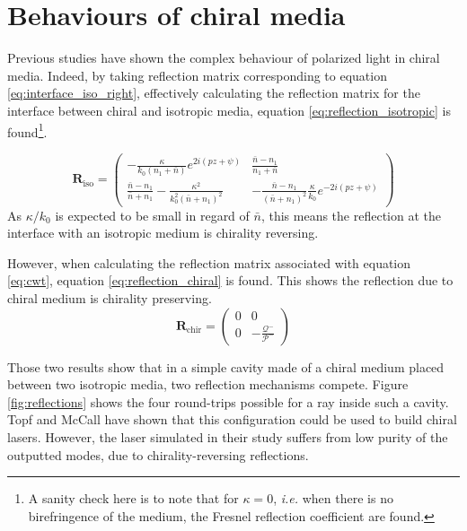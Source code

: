 \section{Behaviours of chiral media}

Previous studies\cite{mccall_simplified_2009} have shown the complex behaviour of polarized light in chiral media. Indeed, by taking reflection matrix corresponding to equation \ref{eq:interface_iso_right}, effectively calculating the reflection matrix for the interface between chiral and isotropic media, equation \ref{eq:reflection_isotropic} is found\footnote{A sanity check here is to note that for $\kappa=0$, \textit{i.e.} when there is no birefringence of the medium, the Fresnel reflection coefficient are found.}.

\begin{equation}
	\bm{R}_{\text{iso}} = \begin{pmatrix}
	-\frac{\kappa}{k_0(n_1+\bar{n})}e^{2i(pz+\psi)} & \frac{\bar{n}-n_1}{n_1+\bar{n}}\\
	\frac{\bar{n}-n_1}{\bar{n}+n_1}-\frac{\kappa^2}{k_0^2(\bar{n}+n_1)^2} & -\frac{\bar{n}-n_1}{(\bar{n}+n_1)^2}\frac{\kappa}{k_0}e^{-2i(pz+\psi)}
	\end{pmatrix}\label{eq:reflection_isotropic}
\end{equation}
%
As $\kappa/k_0$ is expected to be small in regard of $\bar{n}$, this means the reflection at the interface with an isotropic medium is chirality reversing.

However, when calculating the reflection matrix associated with equation \ref{eq:cwt}, equation \ref{eq:reflection_chiral} is found. This shows the reflection due to chiral medium is chirality preserving.
\begin{equation}
\bm{R}_{\text{chir}} = \begin{pmatrix}
	0 & 0\\0 & -\frac{\mathcal{Q}^-}{\mathcal{P}^-}
\end{pmatrix} \label{eq:reflection_chiral}
\end{equation}

Those two results show that in a simple cavity made of a chiral medium placed between two isotropic media, two reflection mechanisms compete. Figure \ref{fig:reflections} shows the four round-trips possible for a ray inside such a cavity. Topf and McCall have shown that this configuration could be used to build chiral lasers\cite{topf_modes_2014}. However, the laser simulated in their study suffers from low purity of the outputted modes, due to chirality-reversing reflections.

